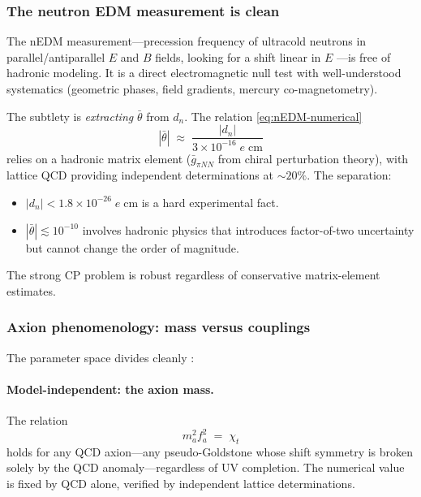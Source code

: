 \subsubsection{The neutron EDM measurement is clean}

The nEDM measurement---precession frequency of ultracold neutrons in parallel/antiparallel $E$ and $B$ fields, looking for a shift linear in $E$ \cite{Abel2020NeutronEDM}---is free of hadronic modeling.  It is a direct electromagnetic null test with well-understood systematics (geometric phases, field gradients, mercury co-magnetometry).

The subtlety is \emph{extracting} $\bar\theta$ from $d_n$.  The relation \eqref{eq:nEDM-numerical}
\begin{equation}\label{eq:nEDM-extraction}
  |\bar\theta| \;\approx\; \frac{|d_n|}{3\times 10^{-16}\;e\;\mathrm{cm}}
\end{equation}
relies on a hadronic matrix element ($\bar{g}_{\pi NN}$ from chiral perturbation theory), with lattice QCD providing independent determinations at $\sim\!20\%$.  The separation:
\begin{itemize}
  \item $|d_n|< 1.8\times 10^{-26}\;e\;\mathrm{cm}$ is a hard experimental fact.
  \item $|\bar\theta|\lesssim 10^{-10}$ involves hadronic physics that introduces factor-of-two uncertainty but cannot change the order of magnitude.
\end{itemize}
The strong CP problem is robust regardless of conservative matrix-element estimates.

\subsubsection{Axion phenomenology: mass versus couplings}

The parameter space divides cleanly \cite{Hook2018TASIStrongCPAxions,Marsh2016AxionCosmology}:

\paragraph{Model-independent: the axion mass.}
The relation
\begin{equation}\label{eq:axion-mass-robust}
  m_a^2 f_a^2 \;=\; \chi_t
\end{equation}
holds for any QCD axion---any pseudo-Goldstone whose shift symmetry is broken solely by the QCD anomaly---regardless of UV completion.  The numerical value is fixed by QCD alone, verified by independent lattice determinations.

